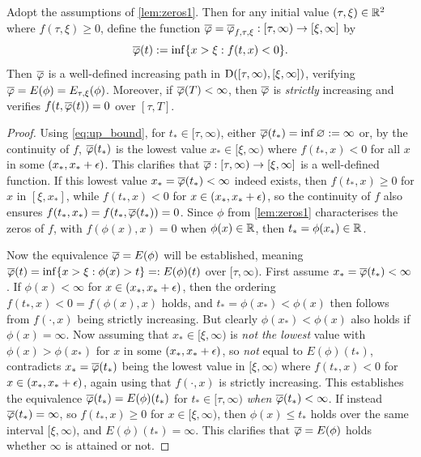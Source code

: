 \begin{lemma}\label{lem:zeros2}
    Adopt the assumptions of \autoref{lem:zeros1}. Then for any initial value $(\tau,\xi)\in\mathbb{R}^2$ where $f(\tau,\xi)\ge0$, define the function $\overline{\varphi}=\overline{\varphi}_{f,\tau,\xi}:[\tau,\infty)\to[\xi,\infty]$ by
    \begin{equation}\label{eq:up_bound}
        \overline{\varphi}(t):=\inf\{x>\xi:f(t,x)<0\}.
    \end{equation}
    Then $\overline{\varphi}$ is a well-defined increasing path in $\mathrm{D}([\tau,\infty),[\xi,\infty])$, verifying $\overline{\varphi} = E(\phi) = E_{\tau,\xi}(\phi)$. Moreover, if $\overline{\varphi}(T)<\infty$, then $\overline{\varphi}$ is \emph{strictly} increasing and verifies $f(t,\overline{\varphi}(t))=0$ over $[\tau,T]$.
\end{lemma}
\begin{proof}
    Using \autoref{eq:up_bound}, for $t_*\in[\tau,\infty)$, either $\overline{\varphi}(t_*)=\inf\varnothing:=\infty$ or, by the continuity of $f$, $\overline{\varphi}(t_*)$ is the lowest value $x_*\in[\xi,\infty)$ where $f(t_*,x)<0$ for all $x$ in some $(x_*,x_*+\epsilon)$. This clarifies that $\overline{\varphi}:[\tau,\infty)\to[\xi,\infty]$ is a well-defined function. If this lowest value $x_*=\overline{\varphi}(t_*)<\infty$ indeed exists, then $f(t_*,x)\ge0$ for $x$ in $[\xi,x_*]$, while $f(t_*,x)<0$ for $x\in(x_*,x_*+\epsilon)$, so the continuity of $f$ also ensures $f(t_*,x_*)=f(t_*,\overline{\varphi}(t_*))=0$. Since $\phi$ from \autoref{lem:zeros1} characterises the zeros of $f$, with $f(\phi(x),x)=0$ when $\phi(x)\in\mathbb{R}$, then $t_* = \phi(x_*)\in\mathbb{R}$.

    Now the equivalence $\overline{\varphi} = E(\phi)$ will be established, meaning $\overline{\varphi}(t)=\inf\{x>\xi:\phi(x)>t\}=:E(\phi)(t)$ over $[\tau,\infty)$. First assume $x_*=\overline{\varphi}(t_*)<\infty$. If $\phi(x)<\infty$ for $x\in(x_*,x_*+\epsilon)$, then the ordering $f(t_*,x)<0=f(\phi(x),x)$ holds, and $t_*=\phi(x_*)<\phi(x)$ then follows from $f(\cdot,x)$ being strictly increasing. But clearly $\phi(x_*)<\phi(x)$ also holds if $\phi(x)=\infty$. Now assuming that $x_*\in[\xi,\infty)$ is \emph{not the lowest} value with $\phi(x)>\phi(x_*)$ for $x$ in some $(x_*,x_*+\epsilon)$, so \emph{not} equal to $E(\phi)(t_*)$, contradicts $x_*=\overline{\varphi}(t_*)$ being the lowest value in $[\xi,\infty)$ where $f(t_*,x)<0$ for $x\in(x_*,x_*+\epsilon)$, again using that $f(\cdot,x)$ is strictly increasing. This establishes the equivalence $\overline{\varphi}(t_*)=E(\phi)(t_*)$ for $t_*\in[\tau,\infty)$ \emph{when} $\overline{\varphi}(t_*)<\infty$. If instead $\overline{\varphi}(t_*)=\infty$, so $f(t_*,x)\ge0$ for $x\in[\xi,\infty)$, then $\phi(x)\le t_*$ holds over the same interval $[\xi,\infty)$, and $E(\phi)(t_*)=\infty$. This clarifies that $\overline{\varphi}=E(\phi)$ holds whether $\infty$ is attained or not.


\end{proof}
